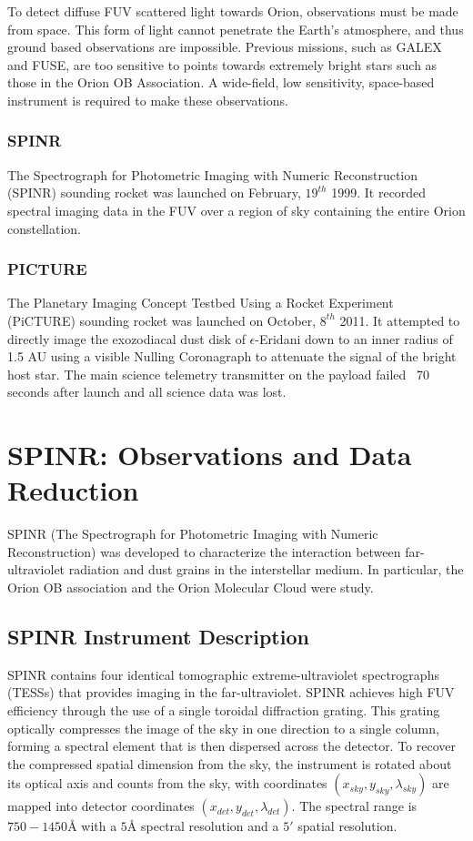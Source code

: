 \documentclass[oneside]{book}
\theoremstyle{definition}
\numberwithin{equation}{section}
\begin{document}
To detect diffuse FUV scattered light towards Orion, observations must be made from space. This form of light cannot penetrate the Earth's atmosphere, and thus ground based observations are impossible. Previous missions, such as GALEX and FUSE, are too sensitive to points towards extremely bright stars such as those in the Orion OB Association. A wide-field, low sensitivity, space-based instrument is required to make these observations. 

\subsubsection{SPINR}

The Spectrograph for Photometric Imaging with Numeric Reconstruction (SPINR) sounding rocket was launched on February, $19^{th}$ 1999. It recorded spectral imaging data in the FUV over a region of sky containing the entire Orion constellation. 

\subsubsection{PICTURE}

The Planetary Imaging Concept Testbed Using a Rocket Experiment (PiCTURE) sounding rocket was launched on October, $8^{th}$ 2011. It attempted to directly image the exozodiacal dust disk of $\epsilon$-Eridani down to an inner radius of 1.5 AU using a visible Nulling Coronagraph to attenuate the signal of the bright host star. The main science telemetry transmitter on the payload failed ~70 seconds after launch and all science data was lost.

\section{SPINR: Observations and Data Reduction}

SPINR (The Spectrograph for Photometric Imaging with Numeric Reconstruction) was developed to characterize the interaction between far-ultraviolet radiation and dust grains in the interstellar medium. In particular, the Orion OB association and the Orion Molecular Cloud were study. 

\subsection{SPINR Instrument Description}

SPINR contains four identical tomographic extreme-ultraviolet spectrographs (TESSs) that provides imaging in the far-ultraviolet. SPINR achieves high FUV efficiency through the use of a single toroidal diffraction grating. This grating optically compresses the image of the sky in one direction to a single column, forming a spectral element that is then dispersed across the detector. To recover the compressed spatial dimension from the sky, the instrument is rotated about its optical axis and counts from the sky, with coordinates $(x_{sky},y_{sky},\lambda_{sky})$ are mapped into detector coordinates $(x_{det},y_{det},\lambda_{det})$. The spectral range is $750-1450$\r{A} with a $5$\r{A} spectral resolution and a $5'$ spatial resolution.
\end{document}
